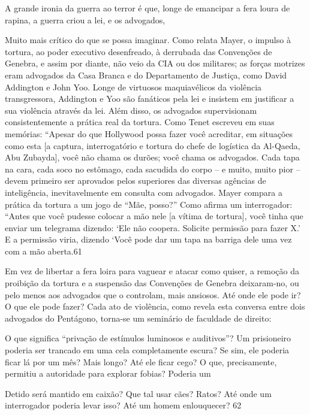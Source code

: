  \par 
A grande ironia da guerra ao terror é que, longe de emancipar a fera loura de rapina, a guerra criou a lei, e os advogados,
 \par 
Muito mais crítico do que se possa imaginar. Como relata Mayer, o impulso à tortura, ao poder executivo desenfreado, à derrubada das Convenções de Genebra, e assim por diante, não veio da CIA ou dos militares; as forças motrizes eram advogados da Casa Branca e do Departamento de Justiça, como David Addington e John Yoo. Longe de virtuosos maquiavélicos da violência transgressora, Addington e Yoo são fanáticos pela lei e insistem em justificar a sua violência através da lei. Além disso, os advogados supervisionam consistentemente a prática real da tortura. Como Tenet escreveu em suas memórias: “Apesar do que Hollywood possa fazer você acreditar, em situações como esta [a captura, interrogatório e tortura do chefe de logística da Al-Qaeda, Abu Zubayda], você não chama os durões; você chama os advogados. Cada tapa na cara, cada soco no estômago, cada sacudida do corpo – e muito, muito pior – devem primeiro ser aprovados pelos superiores das diversas agências de inteligência, inevitavelmente em consulta com advogados. Mayer compara a prática da tortura a um jogo de “Mãe, posso?” Como afirma um interrogador: “Antes que você pudesse colocar a mão nele [a vítima de tortura], você tinha que enviar um telegrama dizendo: ‘Ele não coopera. Solicite permissão para fazer X.’ E a permissão viria, dizendo ‘Você pode dar um tapa na barriga dele uma vez com a mão aberta.{\color{blue}61}
 \par 
Em vez de libertar a fera loira para vaguear e atacar como quiser, a remoção da proibição da tortura e a suspensão das Convenções de Genebra deixaram-no, ou pelo menos aos advogados que o controlam, mais ansiosos. Até onde ele pode ir? O que ele pode fazer? Cada ato de violência, como revela esta conversa entre dois advogados do Pentágono, torna-se um seminário de faculdade de direito:
 \par 
O que significa “privação de estímulos luminosos e auditivos”? Um prisioneiro poderia ser trancado em uma cela completamente escura? Se sim, ele poderia ficar lá por um mês? Mais longo? Até ele ficar cego? O que, precisamente, permitiu a autoridade para explorar fobias? Poderia um
 \par 
Detido será mantido em caixão? Que tal usar cães? Ratos? Até onde um interrogador poderia levar isso? Até um homem enlouquecer? {\color{blue}62}
 \par 
